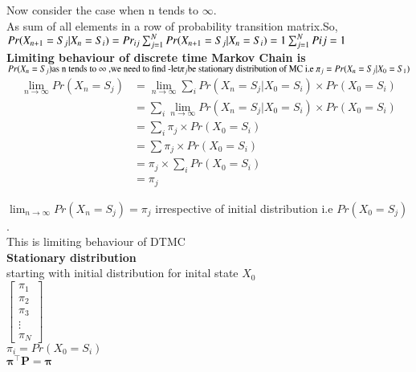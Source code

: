 \documentclass[journel,12pt,twocoloums]{IEEEtran}
\begin{document}
Now consider the case when n tends to $\infty$.\\
As sum of all elements in a row of probability transition matrix.So,\\
\begin{math}
Pr(X_{n+1}=S_j|X_n=S_i)=Pr_{ij}\\

\sum_{j=1}^{N} Pr(X_{n+1}=S_j|X_n=S_i)=1\\

\sum_{j=1}^{N} P{ij}=1\\
\end{math}
\\
\textbf{Limiting behaviour of discrete time Markov Chain is}\\

\begin{math}
Pr(X_n=S_j) \text{as n tends to $\infty$ ,we need to find -}\\
\text{let}  \pi_j \text{be stationary distribution of MC i.e }\\
\pi_j =Pr(X_n=S_j|X_0=S_1)
\end{math}
\begin{align*}
\lim_{n \to \infty}Pr(X_n=S_j) 
 &= \lim_{n \to \infty} \sum_{i} Pr(X_n=S_j |X_0=S_i) \times Pr(X_0=S_i)\\
 &=\sum_{i} \lim_{n \to \infty} Pr(X_n=S_j |X_0=S_i) \times Pr(X_0=S_i)\\
 &= \sum_{i} \pi_j \times Pr(X_0=S_i)\\
 &=\sum \pi_j \times Pr(X_0=S_i)\\
 &=\pi_j \times \sum_{i} Pr(X_0=S_i)\\
 &=\pi_j
\end{align*}

$\lim_{n \to \infty}Pr(X_n=S_j) =\pi_j$ irrespective of initial distribution i.e $Pr(X_0=S_j)$. \\
This is limiting behaviour of DTMC\\

\textbf{Stationary distribution}\\
starting with initial distribution for inital state $X_0$\\
\begin{math}
\left[
\begin{array}{c}
    \pi_1\\
    \pi_2\\
    \pi_3\\
    \vdots\\
    \pi_N
\end{array}\right]
\end{math}
\\
$\pi_i=Pr(X_0=S_i)$\\
$\mathbf{\pi}^\intercal \mathbf{P}=\mathbf{\pi}$
\end{document}
